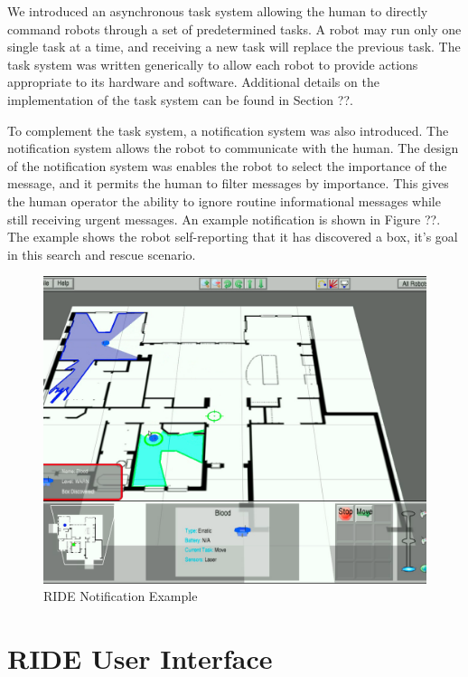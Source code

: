 We introduced an asynchronous task system allowing the human to directly command robots through a set of predetermined tasks. A robot may run only one single task at a time, and receiving a new task will replace the previous task. The task system was written generically to allow each robot to provide actions appropriate to its hardware and software. Additional details on the implementation of the task system can be found in Section ??.

To complement the task system, a notification system was also introduced. The notification system allows the robot to communicate with the human. The design of the notification system was enables the robot to select the importance of the message, and it permits the human to filter messages by importance. This gives the human operator the ability to ignore routine informational messages while still receiving urgent messages. An example notification is shown in Figure ??. The example shows the robot self-reporting that it has discovered a box, it's goal in this search and rescue scenario.

\begin{figure}[ht]
\begin{center}
\includegraphics[width=6.10in]{images/ride-notification.png}
\caption{RIDE Notification Example\label{fig:ride-notification}}
\end{center}
\end{figure}

\section{RIDE User Interface}

